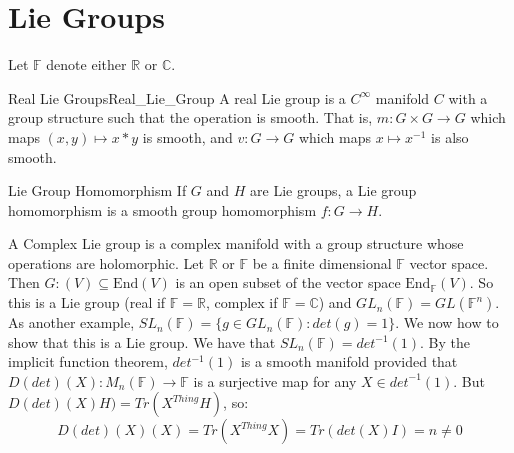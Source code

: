 \section{Lie Groups}
    Let $\mathbb{F}$ denote either $\mathbb{R}$ or $\mathbb{C}$.
    \begin{ldefinition}{Real Lie Groups}{Real_Lie_Group}
        A real Lie group is a $C^{\infty}$ manifold $C$ with a group
        structure such that the operation is smooth. That is,
        $m:G\times{G}\rightarrow{G}$ which maps $(x,y)\mapsto{x}*y$ is
        smooth, and $v:G\rightarrow{G}$ which maps
        $x\mapsto{x}^{\minus{1}}$ is also smooth.
    \end{ldefinition}
    \begin{ldefinition}{Lie Group Homomorphism}{}
        If $G$ and $H$ are Lie groups, a Lie group homomorphism is a
        smooth group homomorphism $f:G\rightarrow{H}$.
    \end{ldefinition}
    \begin{example}
        A Complex Lie group is a complex manifold with a group structure
        whose operations are holomorphic. Let $\mathbb{R}$ or
        $\mathbb{F}$ be a finite dimensional $\mathbb{F}$ vector space.
        Then $G:(V)\subseteq\textrm{End}(V)$ is an open subset of
        the vector space $\textrm{End}_{\mathbb{F}}(V)$. So this is
        a Lie group (real if $\mathbb{F}=\mathbb{R}$, complex if
        $\mathbb{F}=\mathbb{C}$) and
        $GL_{n}(\mathbb{F})=GL(\mathbb{F}^{n})$. As another example,
        $SL_{n}(\mathbb{F})=\{g\in{GL}_{n}(\mathbb{F}):det(g)=1\}$.
        We now how to show that this is a Lie group. We have that
        $SL_{n}(\mathbb{F})=det^{\minus{1}}(1)$. By the implicit
        function theorem, $det^{\minus{1}}(1)$ is a smooth
        manifold provided that
        $D(det)(X):M_{n}(\mathbb{F})\rightarrow\mathbb{F}$ is a
        surjective map for any $X\in{det}^{\minus{1}}(1)$. But
        $D(det)(X)H)=Tr(X^{Thing}H)$, so:
        \begin{equation}
            D(det)(X)(X)=Tr(X^{Thing}X)=Tr(det(X)I)=n\ne{0}
        \end{equation}
    \end{example}
